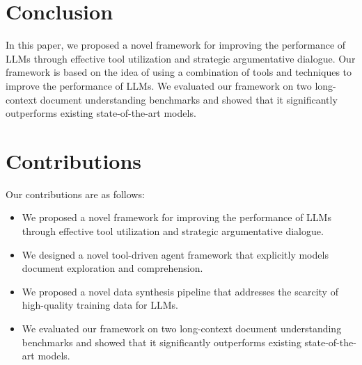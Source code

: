 \documentclass[12pt, a4paper]{article}
\begin{document}
\section{Conclusion}
In this paper, we proposed a novel framework for improving the performance of LLMs through effective tool utilization and strategic argumentative dialogue. Our framework is based on the idea of using a combination of tools and techniques to improve the performance of LLMs. We evaluated our framework on two long-context document understanding benchmarks and showed that it significantly outperforms existing state-of-the-art models.

\section{Contributions}
Our contributions are as follows:

\begin{itemize}
\item We proposed a novel framework for improving the performance of LLMs through effective tool utilization and strategic argumentative dialogue.
\item We designed a novel tool-driven agent framework that explicitly models document exploration and comprehension.
\item We proposed a novel data synthesis pipeline that addresses the scarcity of high-quality training data for LLMs.
\item We evaluated our framework on two long-context document understanding benchmarks and showed that it significantly outperforms existing state-of-the-art models.
\end{itemize}
\end{document}
